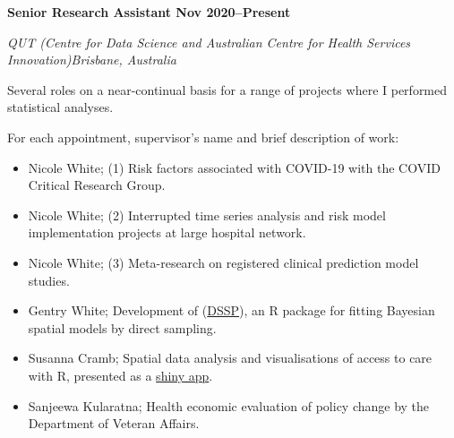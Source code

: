 
\textbf{Senior Research Assistant \hfill Nov 2020--Present}\par
\textit{QUT (Centre for Data Science and Australian Centre for Health Services Innovation)\hfill Brisbane, Australia}\par
Several roles on a near-continual basis for a range of projects where I performed statistical analyses.\par
For each appointment, supervisor's name and brief description of work:\par
\begin{itemize}
	\item Nicole White; (1) Risk factors associated with COVID-19 with the COVID Critical Research Group.
	\item Nicole White; (2) Interrupted time series analysis and risk model implementation projects at large hospital network.
	\item Nicole White; (3) Meta-research on registered clinical prediction model studies.
    \item Gentry White; Development of (\href{https://cran.r-project.org/web/packages/DSSP/index.html}{DSSP}), an R package for fitting Bayesian spatial models by direct sampling.
	\item Susanna Cramb; Spatial data analysis and visualisations of access to care with R, presented as a \href{https://github.com/RWParsons/iTRAQI_app/}{shiny app}.
	\item Sanjeewa Kularatna; Health economic evaluation of policy change by the Department of Veteran Affairs.
\end{itemize}\par
